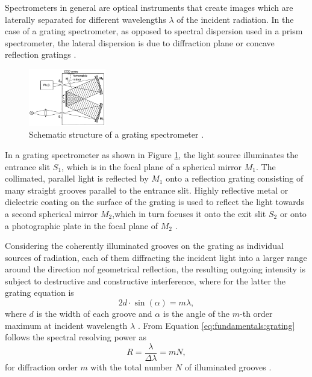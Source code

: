 Spectrometers in general are optical instruments that create images which are laterally separated for different wavelengths $\lambda$ of the incident radiation. In the case of a grating spectrometer, as opposed to spectral dispersion used in a prism spectrometer, the lateral dispersion is due to diffraction plane or concave reflection gratings \cite{demtroder2014laser}.
\begin{figure}
    \centering
    \includegraphics[width=0.3\textwidth]{graphics/spectrometer.png}
    
    \caption[width = 0.1\textwidth]{Schematic structure of a grating spectrometer \cite{demtroder2014laser}.}
    \label{fig:fundamentals:spectrometer}
\end{figure}
In a grating spectrometer as shown in Figure \ref{fig:fundamentals:spectrometer}, the light source illuminates the entrance slit $S_1$, which is in the focal plane of a spherical mirror $M_1$. The collimated, parallel light is reflected by $M_1$ onto a reflection grating consisting of many straight grooves parallel to the entrance slit. Highly reflective metal or dielectric coating on the surface of the grating is used to reflect the light towards a second spherical mirror $M_2$,which in turn focuses it onto the exit slit $S_2$ or onto a photographic plate in the focal plane of $M_2$ \cite{demtroder2014laser}.


\noindent Considering the coherently illuminated grooves on the grating as individual sources of radiation, each of them diffracting the incident light into a larger range around the direction nof geometrical reflection, the resulting outgoing intensity is subject to destructive and constructive interference, where for the latter the grating equation is
\begin{equation}
    \label{eq:fundamentals:grating}
    2 d \cdot \sin(\alpha) = m \lambda ,
\end{equation}
where $d$ is the width of each groove and $\alpha$ is the angle of the $m$-th order maximum at incident wavelength $\lambda$ \cite{demtroder2014laser}. From Equation \ref{eq:fundamentals:grating} follows the spectral resolving power as
\begin{equation}
    \label{eq:fundamentals:resolving}
    R = \frac{\lambda}{\Delta \lambda} = m N ,
\end{equation}
for diffraction order $m$ with the total number $N$ of illuminated grooves \cite{demtroder2014laser}.

